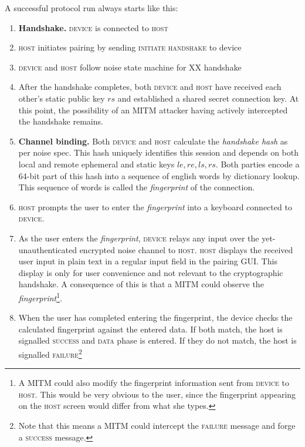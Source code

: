 \documentclass[12pt,a4paper,notitlepage]{article}
\begin{document}
A successful protocol run always starts like this:
\begin{enumerate}
\item \textbf{Handshake.} \textsc{device} is connected to \textsc{host}
\item \textsc{host} initiates pairing by sending \textsc{initiate handshake} to device
\item \textsc{device} and \textsc{host} follow noise state machine for \textsc{XX} handshake
\item After the handshake completes, both \textsc{device} and \textsc{host} have received each other's static public key
    $rs$ and established a shared secret connection key. At this point, the possibility of an MITM attacker having
    actively intercepted the handshake remains.
\item \textbf{Channel binding.} Both \textsc{device} and \textsc{host} calculate the \emph{handshake hash} as per noise spec\cite{perrin01}. This
    hash uniquely identifies this session and depends on both local and remote ephemeral and static keys $le, re, ls,
    rs$.  Both parties encode a 64-bit part of this hash into a sequence of english words by dictionary lookup. This
    sequence of words is called the \emph{fingerprint} of the connection.
\item \textsc{host} prompts the user to enter the \emph{fingerprint} into a keyboard connected to \textsc{device}.
\item As the user enters the \emph{fingerprint}, \textsc{device} relays any input over the yet-unauthenticated encrypted
    noise channel to \textsc{host}. \textsc{host} displays the received user input in plain text in a regular input
    field in the pairing GUI. This display is only for user convenience and not relevant to the cryptographic handshake.
    A consequence of this is that a MITM could observe the \emph{fingerprint}\footnote{
        A MITM could also modify the fingerprint information sent from \textsc{device} to \textsc{host}. This would be
        very obvious to the user, since the fingerprint appearing on the \textsc{host} screen would differ from what she
        types.
    }.
\item When the user has completed entering the fingerprint, the device checks the calculated fingerprint against the
    entered data. If both match, the host is signalled \textsc{success} and \textsc{data} phase is entered. If they do
    not match, the host is signalled \textsc{failure}\footnote{
        Note that this means a MITM could intercept the \textsc{failure} message and forge a \textsc{success} message.
}
\end{enumerate}
\end{document}
